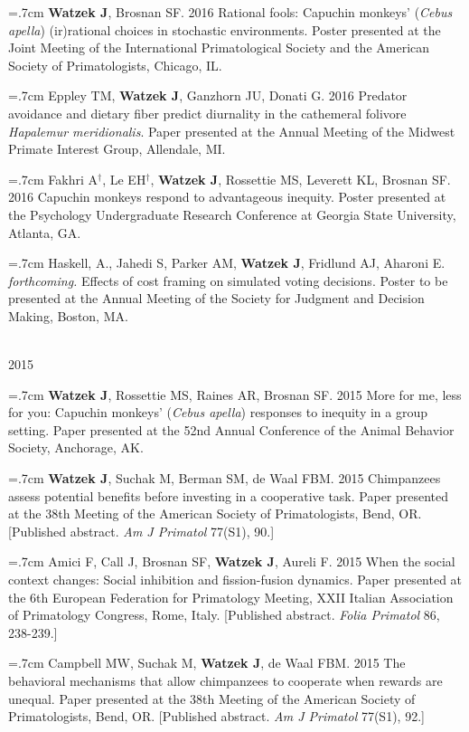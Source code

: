 \documentclass[]{friggeri-cv}
\begin{document}
\hangindent=.7cm \textbf{Watzek J}, Brosnan SF. 2016 Rational fools: Capuchin monkeys' (\emph{Cebus apella}) (ir)rational choices in stochastic environments. Poster presented at the Joint Meeting of the International Primatological Society and the American Society of Primatologists, Chicago, IL.

\hangindent=.7cm Eppley TM, \textbf{Watzek J}, Ganzhorn JU, Donati G. 2016 Predator avoidance and dietary fiber predict diurnality in the cathemeral folivore \emph{Hapalemur meridionalis}. Paper presented at the Annual Meeting of the Midwest Primate Interest Group, Allendale, MI.

\hangindent=.7cm Fakhri A${}^\dagger$, Le EH${}^\dagger$, \textbf{Watzek J}, Rossettie MS, Leverett KL, Brosnan SF. 2016 Capuchin monkeys respond to advantageous inequity. Poster presented at the Psychology Undergraduate Research Conference at Georgia State University, Atlanta, GA.

\hangindent=.7cm Haskell, A., Jahedi S, Parker AM, \textbf{Watzek J}, Fridlund AJ, Aharoni E. \emph{forthcoming.} Effects of cost framing on simulated voting decisions. Poster to be presented at the Annual Meeting of the Society for Judgment and Decision Making, Boston, MA.


{\large{} ~\\[-.15cm] 2015}

\hangindent=.7cm \textbf{Watzek J}, Rossettie MS, Raines AR, Brosnan SF. 2015 More for me, less for you: Capuchin monkeys' (\emph{Cebus apella}) responses to inequity in a group setting. Paper presented at the 52nd Annual Conference of the Animal Behavior Society, Anchorage, AK.

\hangindent=.7cm \textbf{Watzek J}, Suchak M, Berman SM, de Waal FBM. 2015 Chimpanzees assess potential benefits before investing in a cooperative task. Paper presented at the 38th Meeting of the American Society of Primatologists, Bend, OR. [Published abstract. \emph{Am J Primatol} 77(S1), 90.]

\hangindent=.7cm Amici F, Call J, Brosnan SF, \textbf{Watzek J}, Aureli F. 2015 When the social context changes: Social inhibition and fission-fusion dynamics. Paper presented at the 6th European Federation for Primatology Meeting, XXII Italian Association of Primatology Congress, Rome, Italy. [Published abstract. \emph{Folia Primatol} 86, 238-239.]

\hangindent=.7cm Campbell MW, Suchak M, \textbf{Watzek J}, de Waal FBM. 2015 The behavioral mechanisms that allow chimpanzees to cooperate when rewards are unequal. Paper presented at the 38th Meeting of the American Society of Primatologists, Bend, OR. [Published abstract. \emph{Am J Primatol} 77(S1), 92.]
\end{document}
